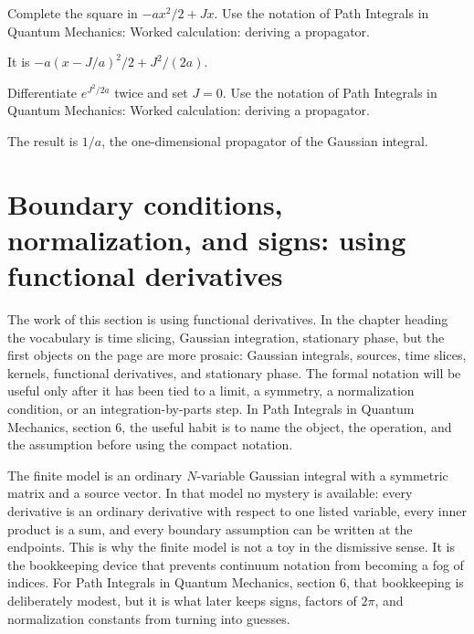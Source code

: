 \begin{exercise}
Complete the square in \(-ax^2/2+Jx\).  Use the notation of Path Integrals in Quantum Mechanics: Worked calculation: deriving a propagator.
\begin{answer}
It is \(-a(x-J/a)^2/2+J^2/(2a)\).
\end{answer}
\end{exercise}

\begin{exercise}
Differentiate \(e^{J^2/2a}\) twice and set \(J=0\).  Use the notation of Path Integrals in Quantum Mechanics: Worked calculation: deriving a propagator.
\begin{answer}
The result is \(1/a\), the one-dimensional propagator of the Gaussian integral.
\end{answer}
\end{exercise}



\section{Boundary conditions, normalization, and signs: using functional derivatives}













The work of this section is using functional derivatives.  In the chapter heading the vocabulary is time slicing, Gaussian integration, stationary phase, but the first objects on the page are more prosaic: Gaussian integrals, sources, time slices, kernels, functional derivatives, and stationary phase.  The formal notation will be useful only after it has been tied to a limit, a symmetry, a normalization condition, or an integration-by-parts step.  In Path Integrals in Quantum Mechanics, section 6, the useful habit is to name the object, the operation, and the assumption before using the compact notation.

The finite model is an ordinary \(N\)-variable Gaussian integral with a symmetric matrix and a source vector.  In that model no mystery is available: every derivative is an ordinary derivative with respect to one listed variable, every inner product is a sum, and every boundary assumption can be written at the endpoints.  This is why the finite model is not a toy in the dismissive sense.  It is the bookkeeping device that prevents continuum notation from becoming a fog of indices.  For Path Integrals in Quantum Mechanics, section 6, that bookkeeping is deliberately modest, but it is what later keeps signs, factors of \(2\pi\), and normalization constants from turning into guesses.

